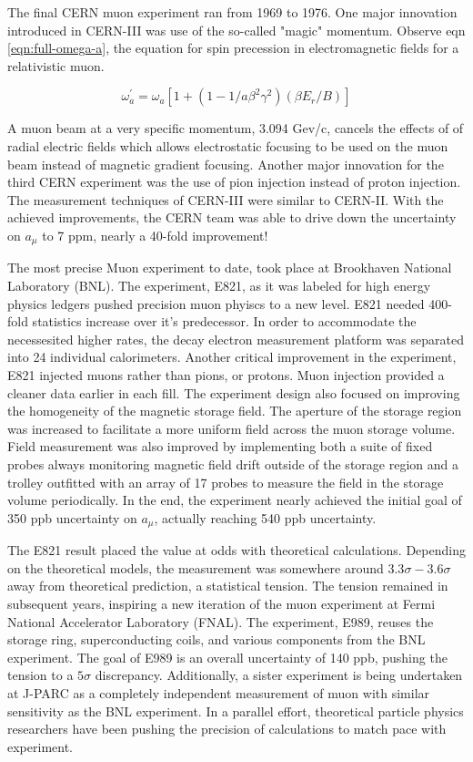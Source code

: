 The final CERN muon \gmtwo experiment ran from 1969 to 1976.  One major innovation introduced in CERN-III was use of the so-called "magic" momentum. Observe eqn \ref{eqn:full-omega-a}, the equation for spin precession in electromagnetic fields for a relativistic muon.

\begin{equation}
\omega^\prime_a = \omega_a[1 + (1 - 1 / a \beta^2 \gamma^2)(\beta E_r / B)]
\label{eqn:full-omega-a}
\end{equation}

A muon beam at a very specific momentum, 3.094 Gev/c, cancels the effects of of radial electric fields which allows electrostatic focusing to be used on the muon beam instead of magnetic gradient focusing.  Another major innovation for the third CERN experiment was the use of pion injection instead of proton injection.  The measurement techniques of CERN-III were similar to CERN-II.  With the achieved improvements, the CERN team was able to drive down the uncertainty on $a_\mu$ to 7 ppm, nearly a 40-fold improvement!

The most precise Muon \gmtwo experiment to date, took place at Brookhaven National Laboratory (BNL). The experiment, E821, as it was labeled for high energy physics ledgers pushed precision muon phyiscs to a new level.  E821 needed 400-fold statistics increase over it's predecessor.  In order to accommodate the necessesited higher rates, the decay electron measurement platform was separated into 24 individual calorimeters.  Another critical improvement in the experiment, E821 injected muons rather than pions, or protons.  Muon injection provided a cleaner data earlier in each fill.  The experiment design also focused on improving the homogeneity of the magnetic storage field.  The aperture of the storage region was increased to facilitate a more uniform field across the muon storage volume.  Field measurement was also improved by implementing both a suite of fixed probes always monitoring magnetic field drift outside of the storage region and a trolley outfitted with an array of 17 probes to measure the field in the storage volume periodically.  In the end, the experiment nearly achieved the initial goal of 350 ppb uncertainty on $a_\mu$, actually reaching 540 ppb uncertainty.

The E821 \gmtwo result placed the value at odds with theoretical calculations.  Depending on the theoretical models, the measurement was somewhere around $3.3\sigma - 3.6\sigma$ away from theoretical prediction, a statistical tension.  The tension remained in subsequent years, inspiring a new iteration of the muon \gmtwo experiment at Fermi National Accelerator Laboratory (FNAL). The experiment, E989, reuses the storage ring, superconducting coils, and various components from the BNL experiment.  The goal of E989 is an overall uncertainty of 140 ppb, pushing the tension to a $5\sigma$ discrepancy. Additionally, a sister experiment is being undertaken at J-PARC as a completely independent measurement of muon \gmtwo with similar sensitivity as the BNL experiment.  In a parallel effort, theoretical particle physics researchers have been pushing the precision of calculations to match pace with experiment.

